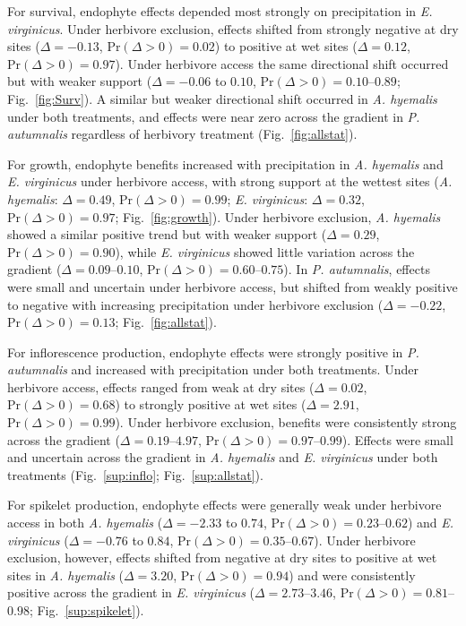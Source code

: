 \documentclass[12pt]{article}\usepackage[]{graphicx}\usepackage[dvipsnames]{xcolor}
\begin{document}
For survival, endophyte effects depended most strongly on precipitation in \textit{E. virginicus}. 
Under herbivore exclusion, effects shifted from strongly negative at dry sites ($\Delta = -0.13$, $\mathrm{Pr}(\Delta > 0) = 0.02$) to positive at wet sites ($\Delta = 0.12$, $\mathrm{Pr}(\Delta > 0) = 0.97$). 
Under herbivore access the same directional shift occurred but with weaker support ($\Delta = -0.06$ to $0.10$, $\mathrm{Pr}(\Delta > 0) = 0.10$--$0.89$; Fig.~\ref{fig:Surv}). 
A similar but weaker directional shift occurred in \textit{A. hyemalis} under both treatments, and effects were near zero across the gradient in \textit{P. autumnalis} regardless of herbivory treatment (Fig.~\ref{fig:allstat}).

For growth, endophyte benefits increased with precipitation in \textit{A. hyemalis} and \textit{E. virginicus} under herbivore access, with strong support at the wettest sites (\textit{A. hyemalis}: $\Delta = 0.49$, $\mathrm{Pr}(\Delta > 0) = 0.99$; \textit{E. virginicus}: $\Delta = 0.32$, $\mathrm{Pr}(\Delta > 0) = 0.97$; Fig.~\ref{fig:growth}). 
Under herbivore exclusion, \textit{A. hyemalis} showed a similar positive trend but with weaker support ($\Delta = 0.29$, $\mathrm{Pr}(\Delta > 0) = 0.90$), while \textit{E. virginicus} showed little variation across the gradient ($\Delta = 0.09$--$0.10$, $\mathrm{Pr}(\Delta > 0) = 0.60$--$0.75$). 
In \textit{P. autumnalis}, effects were small and uncertain under herbivore access, but shifted from weakly positive to negative with increasing precipitation under herbivore exclusion ($\Delta = -0.22$, $\mathrm{Pr}(\Delta > 0) = 0.13$; Fig.~\ref{fig:allstat}).

For inflorescence production, endophyte effects were strongly positive in \textit{P. autumnalis} and increased with precipitation under both treatments. 
Under herbivore access, effects ranged from weak at dry sites ($\Delta = 0.02$, $\mathrm{Pr}(\Delta > 0) = 0.68$) to strongly positive at wet sites ($\Delta = 2.91$, $\mathrm{Pr}(\Delta > 0) = 0.99$). 
Under herbivore exclusion, benefits were consistently strong across the gradient ($\Delta = 0.19$--$4.97$, $\mathrm{Pr}(\Delta > 0) = 0.97$--$0.99$). 
Effects were small and uncertain across the gradient in \textit{A. hyemalis} and \textit{E. virginicus} under both treatments (Fig.~\ref{sup:inflo}; Fig.~\ref{sup:allstat}).

For spikelet production, endophyte effects were generally weak under herbivore access in both \textit{A. hyemalis} ($\Delta = -2.33$ to $0.74$, $\mathrm{Pr}(\Delta > 0) = 0.23$--$0.62$) and \textit{E. virginicus} ($\Delta = -0.76$ to $0.84$, $\mathrm{Pr}(\Delta > 0) = 0.35$--$0.67$). 
Under herbivore exclusion, however, effects shifted from negative at dry sites to positive at wet sites in \textit{A. hyemalis} ($\Delta = 3.20$, $\mathrm{Pr}(\Delta > 0) = 0.94$) and were consistently positive across the gradient in \textit{E. virginicus} ($\Delta = 2.73$--$3.46$, $\mathrm{Pr}(\Delta > 0) = 0.81$--$0.98$; Fig.~\ref{sup:spikelet}).
\end{document}

